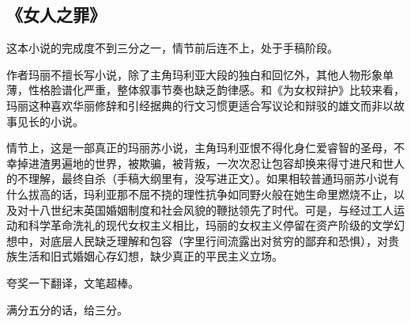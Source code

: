 \subsection{《女人之罪》}

这本小说的完成度不到三分之一，情节前后连不上，处于手稿阶段。

作者玛丽不擅长写小说，除了主角玛利亚大段的独白和回忆外，其他人物形象单薄，性格脸谱化严重，整体叙事节奏也缺乏韵律感。和《为女权辩护》比较来看，玛丽这种喜欢华丽修辞和引经据典的行文习惯更适合写议论和辩驳的雄文而非以故事见长的小说。

情节上，这是一部真正的玛丽苏小说，主角玛利亚恨不得化身仁爱睿智的圣母，不幸掉进渣男遍地的世界，被欺骗，被背叛，一次次忍让包容却换来得寸进尺和世人的不理解，最终自杀（手稿大纲里有，没写进正文）。如果相较普通玛丽苏小说有什么拔高的话，玛利亚那不屈不挠的理性抗争如同野火般在她生命里燃烧不止，以及对十八世纪末英国婚姻制度和社会风貌的鞭挞领先了时代。可是，与经过工人运动和科学革命洗礼的现代女权主义相比，玛丽的女权主义停留在资产阶级的文学幻想中，对底层人民缺乏理解和包容（字里行间流露出对贫穷的鄙弃和恐惧），对贵族生活和旧式婚姻心存幻想，缺少真正的平民主义立场。

夸奖一下翻译，文笔超棒。

满分五分的话，给三分。
